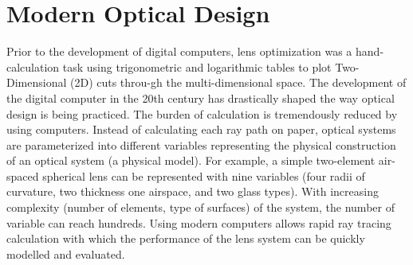 \section{Modern Optical Design}
\vspace{1em}
Prior to the development of digital computers, lens optimization was a hand-calculation task using trigonometric and logarithmic tables to plot Two-Dimensional (2D) cuts throu-gh the multi-dimensional space. The development of the digital computer in the 20th century has drastically shaped the way optical design is being practiced. The burden of calculation is tremendously reduced by using computers. Instead of calculating each ray path on paper,  optical systems are parameterized into different variables representing the physical construction of an optical system (a physical model). For example, a simple two-element air-spaced spherical lens can be represented with nine variables (four radii of curvature, two thickness one airspace, and two glass types). With increasing complexity (number of elements, type of surfaces) of the system, the number of variable can reach hundreds. Using modern computers allows rapid ray tracing calculation with which the performance of the lens system can be quickly modelled and evaluated. 

